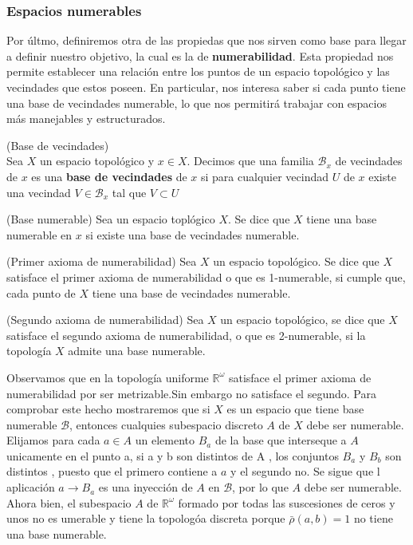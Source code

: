 \subsubsection{Espacios numerables}
Por últmo, definiremos otra de las propiedas que nos sirven como base para llegar a definir nuestro objetivo, la cual es la de \textbf{numerabilidad}. Esta propiedad nos permite establecer una relación entre los puntos de un espacio topológico y las vecindades que estos poseen. En particular, nos interesa saber si cada punto tiene una base de vecindades numerable, lo que nos permitirá trabajar con espacios más manejables y estructurados.

\begin{definition}(Base de vecindades)
    \\Sea $X$ un espacio topológico y $x \in X$. Decimos que una familia $\mathcal{B}_x$ de vecindades de $x$ es una \textbf{base de vecindades} de $x$ si para cualquier vecindad $U$ de $x$ existe una vecindad $V \in  \mathcal{B}_x$ tal que $V \subset U$
\end{definition}

\begin{definition}(Base numerable)
    Sea un espacio toplógico $X$. Se dice que $X$ tiene una base numerable en $x$ si existe una base de vecindades numerable.

\end{definition}


\begin{definition}(Primer axioma de numerabilidad)
    Sea $X$ un espacio topológico. Se dice que $X$ satisface el primer axioma de numerabilidad o que es 1-numerable, si cumple que, cada punto de $X$ tiene una base de vecindades numerable.
\end{definition}


\begin{definition}(Segundo axioma de numerabilidad)
    Sea $X$ un espacio topológico, se dice que $X$ satisface el segundo axioma de numerabilidad, o que es 2-numerable, si la topología $X$ admite una base numerable.
\end{definition}

\begin{example}
    Observamos que en la topología uniforme $\mathbb{R}^\omega$ satisface el primer axioma de numerabilidad por ser metrizable.Sin embargo no satisface el segundo. Para comprobar este hecho mostraremos que si $X$ es un espacio que tiene base numerable $\mathcal{B}$, entonces cualquies subespacio discreto $A$ de $X$ debe ser numerable. Elijamos para cada $a \in A$ un elemento $B_a$ de la base que interseque a $A$ unicamente en el punto a, si a y b son distintos de A , los conjuntos $B_a$ y $B_b$ son distintos , puesto que el primero contiene a $a$ y el segundo no. Se sigue que l aplicación $a \rightarrow B_a$ es una inyección de $A$ en $\mathcal{B}$, por lo que $A$ debe ser numerable.
    Ahora bien, el subespacio $A$ de $\mathbb{R}^\omega$ formado por todas las suscesiones de ceros y unos no es umerable y tiene la topologóa discreta porque $\bar{\rho}(a,b) = 1$ no tiene una base numerable.
\end{example}

